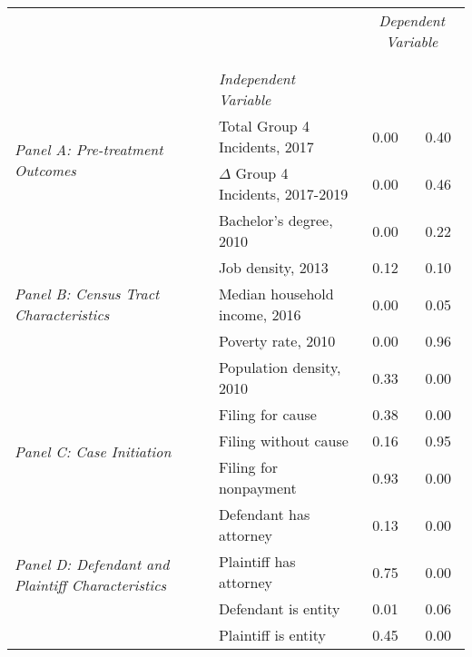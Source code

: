 \begin{tabular}{llcc}
\toprule
 &  & \multicolumn{2}{c}{\textit{Dependent Variable}} \\
\cline{3-4}
\\
 &  &  &  \\
 & \emph{Independent Variable} &  &  \\
\midrule
\multirow[c]{2}{3cm}{\textit{Panel A: Pre-treatment Outcomes}} & Total Group 4 Incidents, 2017 & 0.00 & 0.40 \\
 & $\Delta$ Group 4 Incidents, 2017-2019 & 0.00 & 0.46 \\
\cline{1-4}
\multirow[c]{5}{3cm}{\textit{Panel B: Census Tract Characteristics}} & Bachelor's degree, 2010 & 0.00 & 0.22 \\
 & Job density, 2013 & 0.12 & 0.10 \\
 & Median household income, 2016 & 0.00 & 0.05 \\
 & Poverty rate, 2010 & 0.00 & 0.96 \\
 & Population density, 2010 & 0.33 & 0.00 \\
\cline{1-4}
\multirow[c]{3}{3cm}{\textit{Panel C: Case Initiation}} & Filing for cause & 0.38 & 0.00 \\
 & Filing without cause & 0.16 & 0.95 \\
 & Filing for nonpayment & 0.93 & 0.00 \\
\cline{1-4}
\multirow[c]{4}{3cm}{\textit{Panel D: Defendant and Plaintiff Characteristics}} & Defendant has attorney & 0.13 & 0.00 \\
 & Plaintiff has attorney & 0.75 & 0.00 \\
 & Defendant is entity & 0.01 & 0.06 \\
 & Plaintiff is entity & 0.45 & 0.00 \\
\cline{1-4}
\bottomrule
\end{tabular}

